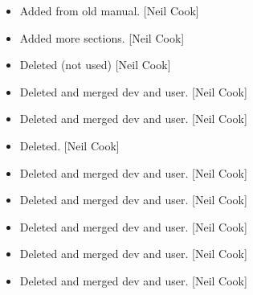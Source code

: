 \documentclass[a4paper,10pt,english]{report}
\begin{document}
\begin{itemize}
\item {} 
Added from old manual. {[}Neil Cook{]}

\item {} 
Added more sections. {[}Neil Cook{]}

\item {} 
Deleted (not used) {[}Neil Cook{]}

\item {} 
Deleted and merged dev and user. {[}Neil Cook{]}

\item {} 
Deleted and merged dev and user. {[}Neil Cook{]}

\item {} 
Deleted. {[}Neil Cook{]}

\item {} 
Deleted and merged dev and user. {[}Neil Cook{]}

\item {} 
Deleted and merged dev and user. {[}Neil Cook{]}

\item {} 
Deleted and merged dev and user. {[}Neil Cook{]}

\item {} 
Deleted and merged dev and user. {[}Neil Cook{]}

\item {} 
Deleted and merged dev and user. {[}Neil Cook{]}

\end{itemize}
\end{document}
